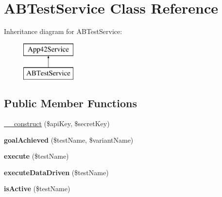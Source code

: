 \hypertarget{class_a_b_test_service}{\section{A\+B\+Test\+Service Class Reference}
\label{class_a_b_test_service}
}
Inheritance diagram for A\+B\+Test\+Service\+:\begin{figure}[H]
\begin{center}
\leavevmode
\includegraphics[height=2.000000cm]{class_a_b_test_service}
\end{center}
\end{figure}
\subsection*{Public Member Functions}
\begin{DoxyCompactItemize}
\item 
\hyperlink{class_a_b_test_service_a49f2ad222e06420736d750e167d55d7c}{\+\_\+\+\_\+construct} (\$api\+Key, \$secret\+Key)
\item 
\hypertarget{class_a_b_test_service_a6bfb42a2b8e0aa11d43fb0918e4bb618}{{\bfseries goal\+Achieved} (\$test\+Name, \$variant\+Name)}\label{class_a_b_test_service_a6bfb42a2b8e0aa11d43fb0918e4bb618}

\item 
\hypertarget{class_a_b_test_service_af2cacdfd0d8db91863d55206954a5ec9}{{\bfseries execute} (\$test\+Name)}\label{class_a_b_test_service_af2cacdfd0d8db91863d55206954a5ec9}

\item 
\hypertarget{class_a_b_test_service_a59d72c99b0664148e61ae905ca22ed83}{{\bfseries execute\+Data\+Driven} (\$test\+Name)}\label{class_a_b_test_service_a59d72c99b0664148e61ae905ca22ed83}

\item 
\hypertarget{class_a_b_test_service_a6cbd66bd23191b54f059ddafb35617d4}{{\bfseries is\+Active} (\$test\+Name)}\label{class_a_b_test_service_a6cbd66bd23191b54f059ddafb35617d4}

\end{DoxyCompactItemize}
